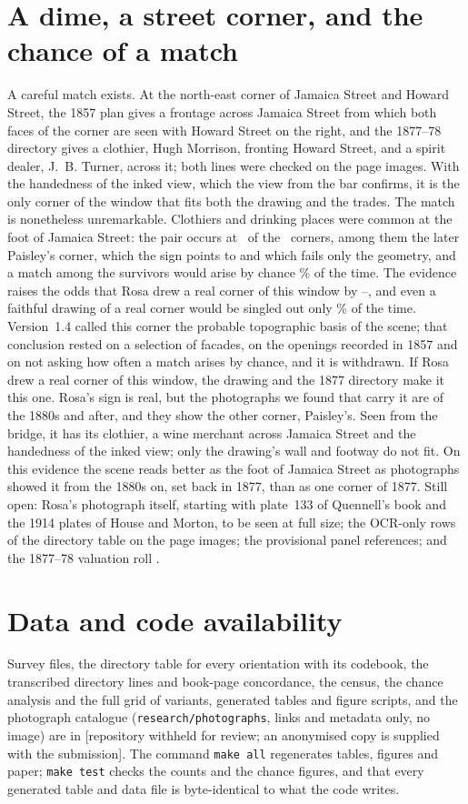 \documentclass[10pt,a4paper]{article}
\newcommand{\repourl}{[repository withheld for review; an anonymised copy is supplied with the submission]}
\newcommand{\repourl}{\url{https://github.com/mlabarrere/a-street-corner-for-a-dime}; archived on Zenodo, concept DOI \href{https://doi.org/10.5281/zenodo.24170392}{10.5281/zenodo.24170392}}
\begin{document}
\section{A dime, a street corner, and the chance of a match}\label{sec:conclusion}
A careful match exists. At the north-east corner of Jamaica Street and Howard Street, the 1857 plan gives a frontage across Jamaica Street from which both faces of the corner are seen with Howard Street on the right, and the 1877--78 directory gives a clothier, Hugh Morrison, fronting Howard Street, and a spirit dealer, J.~B. Turner, across it; both lines were checked on the page images. With the handedness of the inked view, which the view from the bar confirms, it is the only corner of the window that fits both the drawing and the trades. The match is nonetheless unremarkable. Clothiers and drinking places were common at the foot of Jamaica Street: the pair occurs at \MatchHandStrict\ of the \nPop\ corners, among them the later Paisley's corner, which the sign points to and which fails only the geometry, and a match among the survivors would arise by chance \ChanceHandStrict\% of the time. The evidence raises the odds that Rosa drew a real corner of this window by \BFloHandStrict--\BFhiHandStrict, and even a faithful drawing of a real corner would be singled out only \PowerHandStrict\% of the time. Version~1.4 called this corner the probable topographic basis of the scene; that conclusion rested on a selection of facades, on the openings recorded in 1857 and on not asking how often a match arises by chance, and it is withdrawn. If Rosa drew a real corner of this window, the drawing and the 1877 directory make it this one. Rosa's sign is real, but the photographs we found that carry it are of the 1880s and after, and they show the other corner, Paisley's. Seen from the bridge, it has its clothier, a wine merchant across Jamaica Street and the handedness of the inked view; only the drawing's wall and footway do not fit. On this evidence the scene reads better as the foot of Jamaica Street as photographs showed it from the 1880s on, set back in 1877, than as one corner of 1877. Still open: Rosa's photograph itself, starting with plate~133 of Quennell's book and the 1914 plates of House and Morton, to be seen at full size; the OCR-only rows of the directory table on the page images; the provisional panel references; and the 1877--78 valuation roll \citep{nrsVR102,spVR}.

\section*{Data and code availability}
Survey files, the directory table for every orientation with its codebook, the transcribed directory lines and book-page concordance, the census, the chance analysis and the full grid of variants, generated tables and figure scripts, and the photograph catalogue (\texttt{research/photographs}, links and metadata only, no image) are in \repourl. The command \texttt{make all} regenerates tables, figures and paper; \texttt{make test} checks the counts and the chance figures, and that every generated table and data file is byte-identical to what the code writes.
\end{document}
